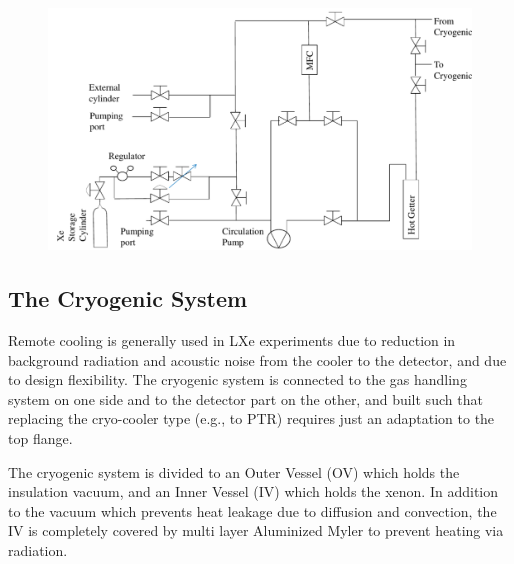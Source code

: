 \begin{figure}[h]
\centerline{\includegraphics[width=0.75\linewidth]{fig/GasSchematics.png}}
\end{figure}


\subsection{The Cryogenic System}
\label{subsec:cryo}

Remote cooling is generally used in LXe experiments due to reduction in background radiation and acoustic noise from the cooler to the detector, and due to design flexibility. The cryogenic system is connected to the gas handling system on 
one side and to the detector part on the other, and built such that replacing the cryo-cooler type (e.g., to PTR) requires just an adaptation to the top flange.


The cryogenic system is divided to an Outer Vessel (OV) which holds 
the insulation vacuum, and an Inner Vessel (IV) which holds the xenon. In addition to the vacuum which prevents heat leakage due to diffusion and convection, the IV is completely covered by multi layer Aluminized Myler to prevent heating via radiation.  

